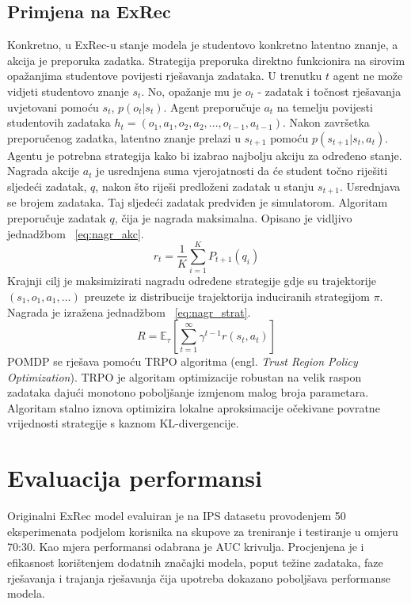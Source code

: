 \subsection{Primjena na ExRec}
Konkretno, u ExRec-u stanje modela je studentovo konkretno latentno znanje, a akcija je preporuka zadatka. Strategija preporuka direktno funkcionira na sirovim opažanjima studentove povijesti rješavanja zadataka. U trenutku $t$ agent ne može vidjeti studentovo znanje $s_t$. No, opažanje mu je $o_t$ - zadatak i točnost rješavanja uvjetovani pomoću $s_t$, $p(o_t|s_t)$. Agent preporučuje $a_t$ na temelju povijesti studentovih zadataka $h_t=(o_1, a_1, o_2, a_2, ..., o_{t-1},a_{t-1})$. Nakon završetka preporučenog zadatka, latentno znanje prelazi u $s_{t+1}$ pomoću $p(s_{t+1}|s_t, a_t)$.\newline
Agentu je potrebna strategija kako bi izabrao najbolju akciju za određeno stanje. Nagrada akcije $a_t$ je usrednjena suma vjerojatnosti da će student točno riješiti sljedeći zadatak, $q$, nakon što riješi predloženi zadatak u stanju $s_{t+1}$. Usrednjava se brojem zadataka. Taj sljedeći zadatak predviđen je simulatorom. Algoritam preporučuje zadatak $q$, čija je nagrada maksimalna. Opisano je vidljivo jednadžbom ~\ref{eq:nagr_akc}.\newline
\begin{equation}
r_{t}=\frac{1}{K} \sum_{i=1}^{K} P_{t+1}\left(q_{i}\right)\label{eq:nagr_akc}
\end{equation}
\newline
\newline
Krajnji cilj je maksimizirati nagradu određene strategije gdje su trajektorije $(s_1, o_1, a_1, ...)$ preuzete iz distribucije trajektorija induciranih strategijom $\pi$. Nagrada je izražena jednadžbom ~\ref{eq:nagr_strat}. \newline
\begin{equation}
R=\mathbb{E}_{\tau}\left[\sum_{t=1}^{\infty} \gamma^{t-1} r\left(s_{t}, a_{t}\right)\right]\label{eq:nagr_strat}
\end{equation}
\newline
POMDP se rješava pomoću TRPO algoritma (engl. \textit{Trust Region Policy Optimization}). TRPO je algoritam optimizacije robustan na velik raspon zadataka dajući monotono poboljšanje izmjenom malog broja parametara. Algoritam stalno iznova optimizira lokalne aproksimacije očekivane povratne vrijednosti strategije s kaznom KL-divergencije.\newline
\newline
\section{Evaluacija performansi}
Originalni ExRec model evaluiran je na IPS datasetu provodenjem 50 eksperimenata podjelom korisnika na skupove za treniranje i testiranje u omjeru 70:30. Kao mjera performansi odabrana je AUC krivulja. Procjenjena je i efikasnost korištenjem dodatnih značajki modela, poput težine zadataka, faze rješavanja i trajanja rješavanja čija upotreba dokazano poboljšava performanse modela. 
